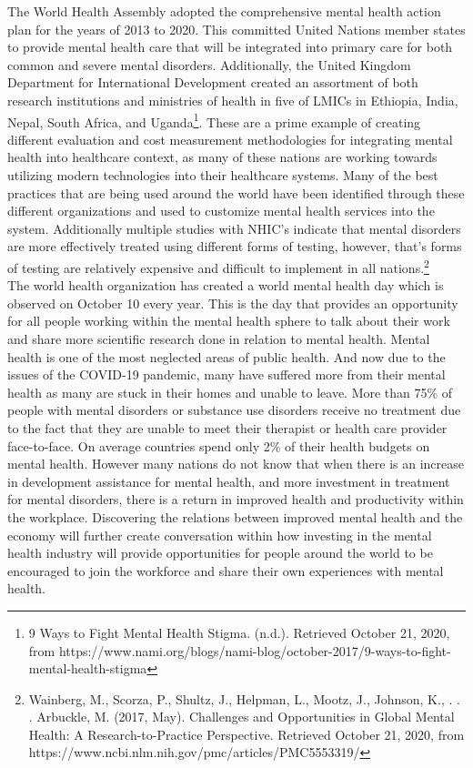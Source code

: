 \documentclass[10pt, letterpaper]{article}
\begin{document}
The World Health Assembly adopted the comprehensive mental health action
plan for the years of 2013 to 2020. This committed United Nations member
states to provide mental health care that will be integrated into
primary care for both common and severe mental disorders. Additionally,
the United Kingdom Department for International Development created an
assortment of both research institutions and ministries of health in
five of LMICs in Ethiopia, India, Nepal, South Africa, and
Uganda\footnote{9 Ways to Fight Mental Health Stigma. (n.d.). Retrieved
  October 21, 2020, from
  https://www.nami.org/blogs/nami-blog/october-2017/9-ways-to-fight-mental-health-stigma}.
These are a prime example of creating different evaluation and cost
measurement methodologies for integrating mental health into healthcare
context, as many of these nations are working towards utilizing modern
technologies into their healthcare systems. Many of the best practices
that are being used around the world have been identified through these
different organizations and used to customize mental health services
into the system. Additionally multiple studies with NHIC's indicate that
mental disorders are more effectively treated using different forms of
testing, however, that's forms of testing are relatively expensive and
difficult to implement in all nations.\footnote{Wainberg, M., Scorza,
  P., Shultz, J., Helpman, L., Mootz, J., Johnson, K., . . . Arbuckle,
  M. (2017, May). Challenges and Opportunities in Global Mental Health:
  A Research-to-Practice Perspective. Retrieved October 21, 2020, from
  https://www.ncbi.nlm.nih.gov/pmc/articles/PMC5553319/} \\

The world health organization has created a world mental health day
which is observed on October 10 every year. This is the day that
provides an opportunity for all people working within the mental health
sphere to talk about their work and share more scientific research done
in relation to mental health. Mental health is one of the most neglected
areas of public health. And now due to the issues of the COVID-19
pandemic, many have suffered more from their mental health as many are
stuck in their homes and unable to leave. More than 75\% of people with
mental disorders or substance use disorders receive no treatment due to
the fact that they are unable to meet their therapist or health care
provider face-to-face. On average countries spend only 2\% of their
health budgets on mental health. However many nations do not know that
when there is an increase in development assistance for mental health,
and more investment in treatment for mental disorders, there is a return
in improved health and productivity within the workplace. Discovering
the relations between improved mental health and the economy will
further create conversation within how investing in the mental health
industry will provide opportunities for people around the world to be
encouraged to join the workforce and share their own experiences with
mental health. 
\end{document}
